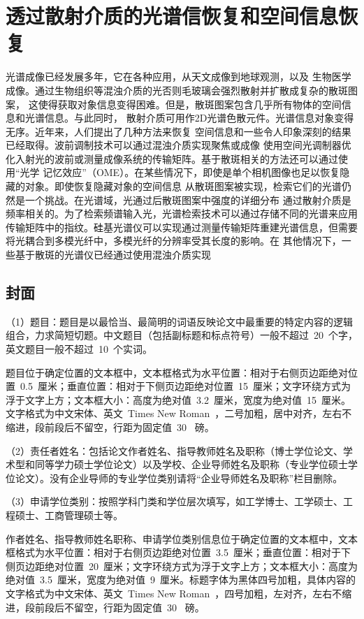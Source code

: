 
\chapter{透过散射介质的光谱信恢复和空间信息恢复}

光谱成像已经发展多年，它在各种应用，从天文成像到地球观测，以及
生物医学成像。通过生物组织等混浊介质的光否则毛玻璃会强烈散射并扩散成复杂的散斑图案，
这使得获取对象信息变得困难。但是，散斑图案包含几乎所有物体的空间信息和光谱信息。与此同时，
散射介质可用作2D光谱色散元件。光谱信息对象变得无序。近年来，人们提出了几种方法来恢复
空间信息和一些令人印象深刻的结果已经取得。波前调制技术可以通过混浊介质实现聚焦或成像
使用空间光调制器优化入射光的波前或测量成像系统的传输矩阵。基于散斑相关的方法还可以通过使用“光学
记忆效应”（OME）。在某些情况下，即使是单个相机图像也足以恢复隐藏的对象。即使恢复隐藏对象的空间信息
从散斑图案被实现，检索它们的光谱仍然是一个挑战。在光谱域，光通过后散斑图案中强度的详细分布
通过散射介质是频率相关的。为了检索频谱输入光，光谱检索技术可以通过存储不同的光谱来应用
传输矩阵中的指纹。硅基光谱仪可以实现通过测量传输矩阵重建光谱信息，但需要将光耦合到多模光纤中，多模光纤的分辨率受其长度的影响。在
其他情况下，一些基于散斑的光谱仪已经通过使用混浊介质实现

\section{封面}

（1）题目：题目是以最恰当、最简明的词语反映论文中最重要的特定内容的逻辑组合，力求简短切题。中文题目（包括副标题和标点符号）一般不超过~20~个字，英文题目一般不超过~10~个实词。

题目位于确定位置的文本框中，文本框格式为水平位置：相对于右侧页边距绝对位置~0.5~厘米；垂直位置：相对于下侧页边距绝对位置~15~厘米；文字环绕方式为浮于文字上方；文本框大小：高度为绝对值~3.2~厘米，宽度为绝对值~15~厘米。文字格式为中文宋体、英文~Times New Roman~，二号加粗，居中对齐，左右不缩进，段前段后不留空，行距为固定值~30~ 磅。

（2）责任者姓名：包括论文作者姓名、指导教师姓名及职称（博士学位论文、学术型和同等学力硕士学位论文）以及学校、企业导师姓名及职称（专业学位硕士学位论文）。没有企业导师的专业学位类别请将“企业导师姓名及职称”栏目删除。

（3）申请学位类别：按照学科门类和学位层次填写，如工学博士、工学硕士、工程硕士、工商管理硕士等。

作者姓名、指导教师姓名职称、申请学位类别信息位于确定位置的文本框中，文本框格式为水平位置：相对于右侧页边距绝对位置~3.5~厘米；垂直位置：相对于下侧页边距绝对位置~20~厘米；文字环绕方式为浮于文字上方；文本框大小：高度为绝对值~3.5~厘米，宽度为绝对值~9~厘米。标题字体为黑体四号加粗，具体内容的文字格式为中文宋体、英文~Times New Roman~，四号加粗，左对齐，左右不缩进，段前段后不留空，行距为固定值~30~ 磅。

